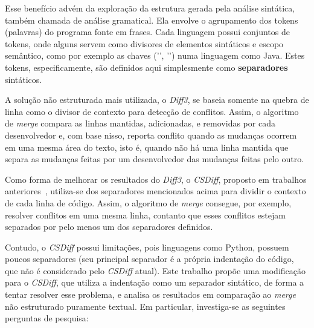 Esse benefício advém da exploração da estrutura gerada pela análise sintática,
também chamada de análise gramatical. Ela envolve o agrupamento dos tokens (palavras) do programa fonte em frases.
Cada linguagem possui conjuntos de tokens, onde alguns servem como divisores de elementos sintáticos e escopo semântico,
como por exemplo as chaves ('{', '}') numa linguagem como Java. Estes tokens,
especificamente, são definidos aqui simplesmente como \textbf{separadores} sintáticos.

A solução não estruturada mais utilizada, o \emph{Diff3}, se baseia somente na quebra de linha como o divisor de contexto para
detecção de conflitos. Assim, o algoritmo de \emph{merge} compara as linhas mantidas, adicionadas,
e removidas por cada desenvolvedor
e, com base nisso, reporta conflito quando as mudanças ocorrem em uma mesma área do texto, isto é,
quando não há uma linha mantida que separa as mudanças feitas por um desenvolvedor das mudanças feitas pelo outro.

Como forma de melhorar os resultados do \emph{Diff3}, o \emph{CSDiff}, proposto em trabalhos anteriores~\cite{clem21}, utiliza-se dos separadores
mencionados acima para dividir o contexto de cada linha de código. Assim, o algoritmo de \emph{merge} consegue,
por exemplo, resolver
conflitos em uma mesma linha, contanto que esses conflitos estejam separados por pelo menos um dos separadores definidos.

Contudo, o \emph{CSDiff} possui limitações, pois linguagens como Python, possuem poucos separadores (seu principal separador
é a própria indentação do código, que não é considerado pelo \emph{CSDiff} atual). Este trabalho propõe uma modificação
para o \emph{CSDiff}, que utiliza a indentação como um separador sintático, de forma a tentar
resolver esse problema, e analisa os resultados em comparação ao \emph{merge} não estruturado puramente textual.
Em particular, investiga-se as seguintes perguntas de pesquisa:

